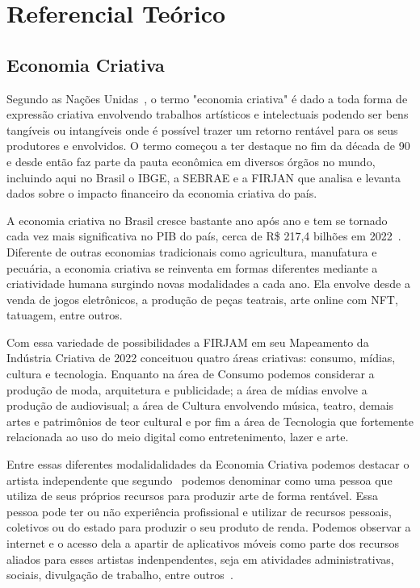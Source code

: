 \chapter{Referencial Teórico}\label{ch:referencial-teorico}

\section{Economia Criativa}\label{sec:economia-criativa}

Segundo as Nações Unidas~\cite{sebrae}, o termo "economia criativa" é dado a toda forma de expressão criativa envolvendo trabalhos artísticos e intelectuais podendo ser bens tangíveis ou intangíveis onde é possível trazer um retorno rentável para os seus produtores e envolvidos.
O termo começou a ter destaque no fim da década de 90 e desde então faz parte da pauta econômica em diversos órgãos no mundo, incluindo aqui no Brasil o IBGE, a  SEBRAE e a FIRJAN que analisa e levanta dados sobre o impacto financeiro da economia criativa do país.

A economia criativa no Brasil cresce bastante ano após ano e tem se tornado cada vez mais significativa no PIB do país, cerca de R\$ 217,4 bilhões em 2022~\cite{firjam}.
Diferente de outras economias tradicionais como agricultura, manufatura e pecuária, a economia criativa se reinventa em formas diferentes mediante a criatividade humana surgindo novas modalidades a cada ano.
Ela envolve desde a venda de jogos eletrônicos, a produção de peças teatrais, arte online com NFT, tatuagem, entre outros.

Com essa variedade de possibilidades a FIRJAM em seu Mapeamento da Indústria Criativa de 2022 conceituou quatro áreas criativas: consumo, mídias, cultura e tecnologia.
Enquanto na área de Consumo podemos considerar a produção de moda, arquitetura e publicidade; a área de mídias envolve a produção de audiovisual; a área de Cultura envolvendo música, teatro, demais artes e patrimônios de teor cultural e por fim a área de Tecnologia que fortemente relacionada ao uso do meio digital como entretenimento, lazer e arte.

Entre essas diferentes modalidalidades da Economia Criativa podemos destacar o artista independente que segundo~\cite{artista} podemos denominar como uma pessoa que utiliza de seus próprios recursos para produzir arte de forma rentável. 
Essa pessoa pode ter ou não experiência profissional e utilizar de recursos pessoais, coletivos ou do estado para produzir o seu produto de renda.
Podemos observar a internet e o acesso dela a apartir de aplicativos móveis como parte dos recursos aliados para esses artistas indenpendentes, seja em atividades administrativas, sociais, divulgação de trabalho, entre outros~\cite{bittencourt}.


